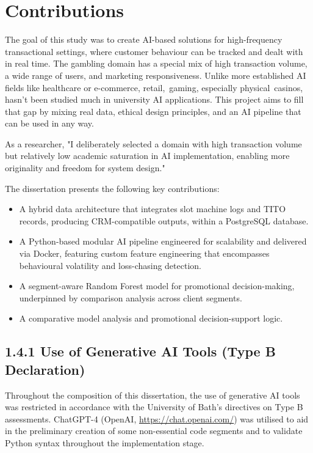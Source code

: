 \documentclass[12pt,a4paper]{report}
\begin{document}
\section{Contributions}

The goal of this study was to create AI-based solutions for high-frequency transactional settings, where customer behaviour can be tracked and dealt with in real time.  The gambling domain has a special mix of high transaction volume, a wide range of users, and marketing responsiveness.  Unlike more established AI fields like healthcare or e-commerce, retail, gaming, especially physical casinos, hasn't been studied much in university AI applications.  This project aims to fill that gap by mixing real data, ethical design principles, and an AI pipeline that can be used in any way.

As a researcher, "I deliberately selected a domain with high transaction volume but relatively low academic saturation in AI implementation, enabling more originality and freedom for system design."

The dissertation presents the following key contributions:

\begin{itemize}
    \item A hybrid data architecture that integrates slot machine logs and TITO records, producing CRM-compatible outputs, within a PostgreSQL database.
    \item A Python-based modular AI pipeline engineered for scalability and delivered via Docker, featuring custom feature engineering that encompasses behavioural volatility and loss-chasing detection.
    \item A segment-aware Random Forest model for promotional decision-making, underpinned by comparison analysis across client segments.
    \item A comparative model analysis and promotional decision-support logic.
\end{itemize}

\subsection*{1.4.1 Use of Generative AI Tools (Type B Declaration)}

Throughout the composition of this dissertation, the use of generative AI tools was restricted in accordance with the University of Bath's directives on Type B assessments. ChatGPT-4 (OpenAI, \url{https://chat.openai.com/}) was utilised to aid in the preliminary creation of some non-essential code segments and to validate Python syntax throughout the implementation stage.
\end{document}
